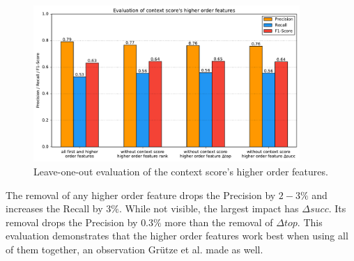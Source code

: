 \begin{figure}[H]
	\centering
	\includegraphics[width=0.9\textwidth]{img/higher_order_eval_context}
	\caption{Leave-one-out evaluation of the context score's higher order features.}
	\label{ho_eval_context}
\end{figure}
The removal of any higher order feature drops the Precision by $2-3\%$ and increases the Recall by $3\%$. While not visible, the largest impact has $\Delta succ$. Its removal drops the Precision by $0.3\%$ more than the removal of $\Delta top$. This evaluation demonstrates that the higher order features work best when using all of them together, an observation Grütze et al. \cite{coheel} made as well.

